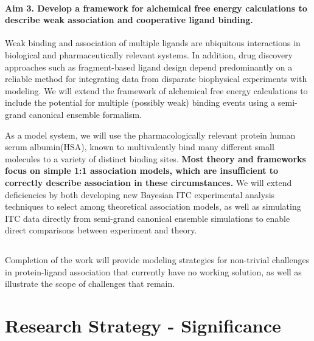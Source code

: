 \documentclass[10pt,final]{article}
\newif\ifinstr
\newcommand{\instr}[1]{\ifdraft{\ifinstr {\color{cyan}\emph{#1}} \fi}{}}
\begin{document}
\paragraph*{Aim 3. Develop a framework for alchemical free energy calculations to describe weak association and cooperative ligand binding.}
Weak binding and association of multiple ligands are ubiquitous interactions in biological and pharmaceutically relevant systems.
%
In addition, drug discovery approaches such as fragment-based ligand design depend predominantly on a reliable method for integrating data from disparate biophysical experiments with modeling.
%
We will extend the framework of alchemical free energy calculations  to include the potential for multiple (possibly weak) binding events using a semi-grand canonical ensemble formalism.
%

As a model system, we will use the pharmacologically relevant protein human serum albumin(HSA), known to multivalently bind many different small molecules to a variety of distinct binding sites.
%
\textbf{Most theory and frameworks focus on simple 1:1 association models, which are insufficient to correctly describe association in these circumstances.}
%
We will extend deficiencies by both developing new Bayesian ITC experimental analysis techniques to select among theoretical association models,
%
as well as simulating ITC data directly from semi-grand canonical ensemble simulations to enable direct comparisons between experiment and theory.

\subsection*{} %
Completion of the work will provide modeling strategies for non-trivial challenges in protein-ligand association that currently have no working solution, as well as illustrate the scope of challenges that remain.

\section*{Research Strategy - Significance}
\instr{General background, significance in terms of basic science and disease relevance.}
\end{document}
